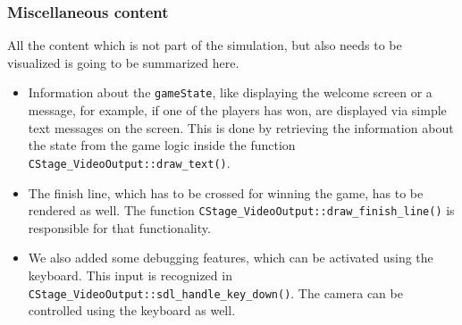 \subsubsection{Miscellaneous content}
All the content which is not part of the simulation, but also needs to be visualized is going to be summarized here.
\begin{itemize}
\item Information about the \texttt{gameState}, like displaying the welcome screen or a message, for example, if one of the players has won, are displayed via simple text messages on the screen. This is done by retrieving the information about the state from the game logic inside the function \texttt{CStage_VideoOutput::draw_text()}.
\item The finish line, which has to be crossed for winning the game, has to be rendered as well. The function \texttt{CStage_VideoOutput::draw_finish_line()} is responsible for that functionality. 
\item We also added some debugging features, which can be activated using the keyboard. This input is recognized in \texttt{CStage_VideoOutput::sdl_handle_key_down()}. The camera can be controlled using the keyboard as well.
\end{itemize}
